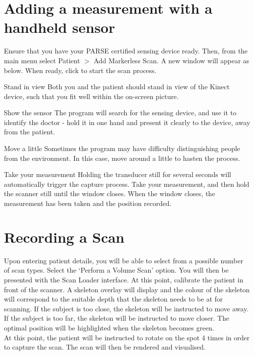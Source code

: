 \section*{Adding a measurement with a handheld sensor}
Ensure that you have your PARSE certified sensing device ready. Then, from the main menu select Patient $>$ Add Markerless Scan. A new window will appear as below. When ready, click to start the scan process.\\
\begin{Description}
\item[Stand in view] Both you and the patient should stand in view of the Kinect device, such that you fit well within the on-screen picture.
\item[Show the sensor] The program will search for the sensing device, and use it to identify the doctor - hold it in one hand and present it clearly to the device, away from the patient.
\item[Move a little] Sometimes the program may have difficulty distinguishing people from the environment. In this case, move around a little to hasten the process.
\item[Take your measurement] Holding the transducer still for several seconds will automatically trigger the capture process. Take your measurement, and then hold the scanner still until the window closes. When the window closes, the measurement has been taken and the position recorded. 

\section{Recording a Scan}

Upon entering patient details, you will be able to select from a possible number of scan types. Select the `Perform a Volume Scan' option. You will then be presented with the Scan Loader interface. At this point, calibrate the patient in front of the scanner. A skeleton overlay will display and the colour of the skeleton will correspond to the suitable depth that the skeleton needs to be at for scanning. If the subject is {\color{blue}too close}, the skeleton will be instructed to move away. If the subject is {\color{red}too far}, the skeleton will be instructed to move closer. The optimal position will be highlighted when the skeleton becomes {\color{green}green}. \\

At this point, the patient will be instructed to rotate on the spot 4 times in order to capture the scan. The scan will then be rendered and visualised. \\


\end{Description}
